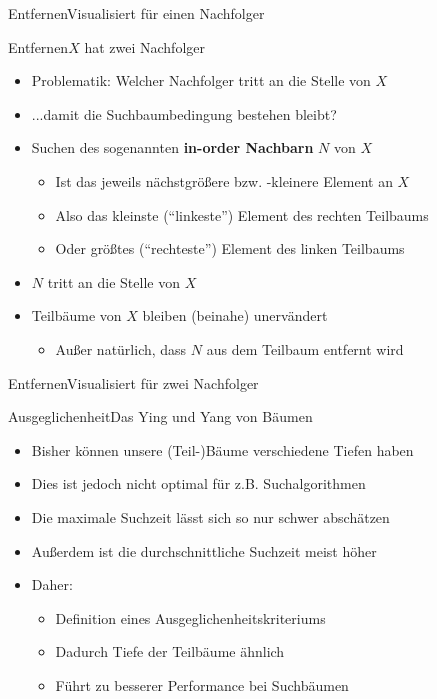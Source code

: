 \begin{frame}{Entfernen}{Visualisiert für einen Nachfolger}
\end{frame}

\begin{frame}{Entfernen}{$X$ hat zwei Nachfolger}
	\begin{itemize}
		\item Problematik: Welcher Nachfolger tritt an die Stelle von $X$
		\item ...damit die Suchbaumbedingung bestehen bleibt?
		\item Suchen des sogenannten \textbf{in-order Nachbarn} $N$ von $X$
		\begin{itemize}
			\item Ist das jeweils nächstgrößere bzw. -kleinere Element an $X$
			\item Also das kleinste ("`linkeste"') Element des rechten Teilbaums
			\item Oder größtes ("`rechteste"') Element des linken Teilbaums
		\end{itemize}
		\item $N$ tritt an die Stelle von $X$
		\item Teilbäume von $X$ bleiben (beinahe) unervändert
		\begin{itemize}
			\item Außer natürlich, dass $N$ aus dem Teilbaum entfernt wird
		\end{itemize}
	\end{itemize}
\end{frame}

\begin{frame}{Entfernen}{Visualisiert für zwei Nachfolger}
\end{frame}

\begin{frame}{Ausgeglichenheit}{Das Ying und Yang von Bäumen}
	\begin{itemize}
		\item Bisher können unsere (Teil-)Bäume verschiedene Tiefen haben
		\item Dies ist jedoch nicht optimal für z.B. Suchalgorithmen
		\item Die maximale Suchzeit lässt sich so nur schwer abschätzen
		\item Außerdem ist die durchschnittliche Suchzeit meist höher
		\item Daher:
		\begin{itemize}
			\item Definition eines Ausgeglichenheitskriteriums
			\item Dadurch Tiefe der Teilbäume ähnlich
			\item Führt zu besserer Performance bei Suchbäumen
		\end{itemize}
	\end{itemize}
\end{frame}

